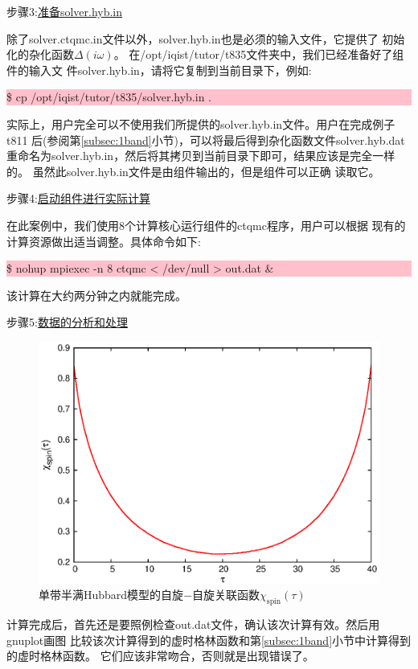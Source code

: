 步骤3:\underline{准备solver.hyb.in}

除了solver.ctqmc.in文件以外，solver.hyb.in也是必须的输入文件，它提供了
初始化的杂化函数$\Delta(i\omega)$。
在/opt/iqist/tutor/t835文件夹中，我们已经准备好了{\gardenia}组件的输入文
件solver.hyb.in，请将它复制到当前目录下，例如:

\noindent\colorbox{pink}{\parbox[r]{\linewidth}{\quad \$ cp /opt/iqist/tutor/t835/solver.hyb.in . }}

实际上，用户完全可以不使用我们所提供的solver.hyb.in文件。用户在完成例子t811
后(参阅第\ref{subsec:1band}小节)，可以将最后得到杂化函数文件solver.hyb.dat
重命名为solver.hyb.in，然后将其拷贝到当前目录下即可，结果应该是完全一样的。
虽然此solver.hyb.in文件是由{\azalea}组件输出的，但是{\gardenia}组件可以正确
读取它。

步骤4:\underline{启动{\gardenia}组件进行实际计算}

在此案例中，我们使用8个计算核心运行{\gardenia}组件的ctqmc程序，用户可以根据
现有的计算资源做出适当调整。具体命令如下:

\noindent\colorbox{pink}{\parbox[r]{\linewidth}{\quad \$ nohup mpiexec -n 8 ctqmc < /dev/null >  out.dat \&}}
该计算在大约两分钟之内就能完成。

步骤5:\underline{数据的分析和处理}

\begin{figure}
\centering
\includegraphics{figure/schi.eps}
\caption{单带半满Hubbard模型的自旋$-$自旋关联函数$\chi_{\text{spin}}(\tau)$} 
\label{fig:schi}
\end{figure}

计算完成后，首先还是要照例检查out.dat文件，确认该次计算有效。然后用gnuplot画图
比较该次计算得到的虚时格林函数和第\ref{subsec:1band}小节中计算得到的虚时格林函数。
它们应该非常吻合，否则就是出现错误了。

